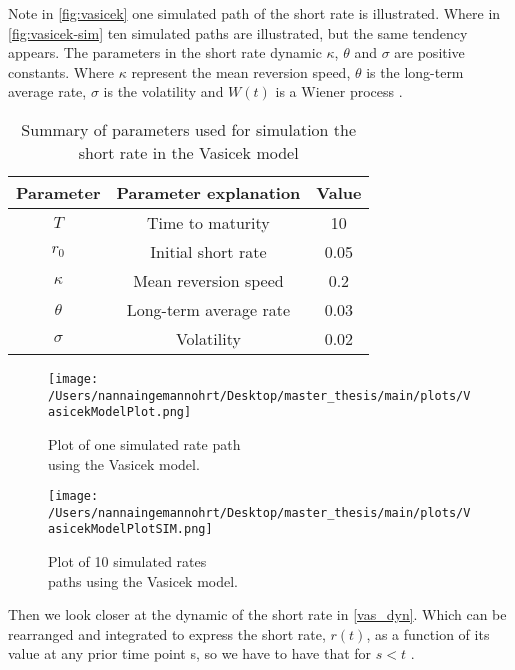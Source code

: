  Note in \autoref{fig:vasicek}
one simulated path of the short rate is illustrated. Where in \autoref{fig:vasicek-sim} ten simulated paths are illustrated,
but the same tendency appears. The parameters in the short rate dynamic
$\kappa$, $\theta$ and $\sigma$ are positive constants. Where $\kappa$ represent the mean reversion speed, $\theta$ 
is the long-term average rate, $\sigma$ is the volatility  and $W(t)$ is a Wiener process \cite{Bermudan}. 
\begin{table}[H]
    \centering
    \begin{tabular}{ccc}
      \toprule
      \textbf{Parameter} & \textbf{Parameter explanation} & \textbf{Value} \\
      \midrule
      $T$ & Time to maturity & 10 \\
      $r_0$ & Initial short rate & 0.05 \\
      $\kappa$ & Mean reversion speed & 0.2\\
      $\theta$ & Long-term average rate  & 0.03 \\
      $\sigma$ & Volatility& 0.02 \\
      \bottomrule
    \end{tabular}
    \caption{Summary of parameters used for simulation the short rate in the Vasicek model}
    \label{tab:parameters_short_rate}
\end{table}
\noindent
\begin{figure}[H]
    \centering
    \begin{minipage}{0.5\textwidth}
        \texttt{[image: /Users/nannaingemannohrt/Desktop/master\_thesis/main/plots/VasicekModelPlot.png]}
        \caption{Plot of one simulated rate path \\ using the Vasicek model.}
        \label{fig:vasicek}
    \end{minipage}\hfill 
    \begin{minipage}{0.5\textwidth}
        \texttt{[image: /Users/nannaingemannohrt/Desktop/master\_thesis/main/plots/VasicekModelPlotSIM.png]}
        \caption{Plot of 10 simulated  rates \\ paths using the Vasicek model.}
        \label{fig:vasicek-sim}
    \end{minipage}
\end{figure}
\noindent
Then we look closer at the dynamic of the short rate in \autoref{vas_dyn}. Which can be rearranged and integrated
to express the short rate, $r(t)$, as a function of its value at any prior time point s, 
so we have to have that for $s < t$ \cite{Bermudan}. 
